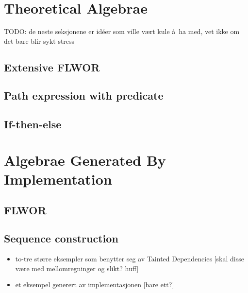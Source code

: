 \section{Theoretical Algebrae}
TODO: de neste seksjonene er idéer som ville v\ae rt kule \aa~ha med, vet ikke
om det bare blir sykt stress
\subsection{Extensive FLWOR}
\subsection{Path expression with predicate}
\subsection{If-then-else}

\section{Algebrae Generated By Implementation}
\subsection{FLWOR}
\subsection{Sequence construction}

\begin{itemize}
  \item to-tre større eksempler som benytter seg av Tainted Dependencies [skal
  disse v\ae re med mellomregninger og slikt? huff]
  \item et eksempel generert av implementasjonen [bare ett?]
\end{itemize}